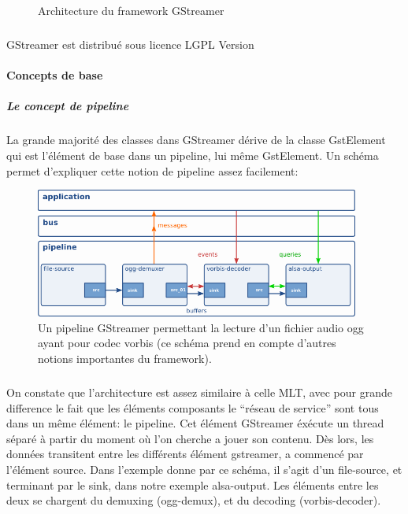 {\begin{figure} [H]
\begin{center}
  \end{center}

  \caption{Architecture du framework GStreamer}

  \label{Yes}

\end{figure}

\subparagraph{}

GStreamer est distribué sous licence LGPL Version

\paragraph{Concepts de base}

\subparagraph{Le concept de pipeline}

\subparagraph{}

La grande majorité des classes dans GStreamer dérive de la classe
GstElement qui est l'élément de base dans un pipeline, lui même
GstElement. Un schéma permet d'expliquer cette notion de pipeline assez
facilement:

\begin{figure} [H]

  \begin{center}

    \includegraphics[width=0.95\textwidth]{images/gstpipeline}

  \end{center}

  \caption{Un pipeline GStreamer permettant la lecture d'un fichier
  audio ogg
    ayant pour codec vorbis (ce schéma prend en compte d'autres notions
    importantes du framework).}

  \label{Yes}

\end{figure}

\subparagraph{}

On constate que l'architecture est assez similaire à celle MLT, avec
pour grande difference le fait que les éléments composants le ``réseau
de service'' sont tous dans un même élément: le pipeline. Cet élément
GStreamer éxécute un thread séparé à partir du moment où l'on cherche a
jouer son contenu. Dès lors, les données transitent entre les différents
élément gstreamer, a commencé par l'élément source. Dans l'exemple
donne par ce schéma, il s'agit d'un file-source, et terminant par le
sink, dans notre exemple alsa-output. Les éléments entre les deux se
chargent du demuxing (ogg-demux), et du decoding (vorbis-decoder).

}
